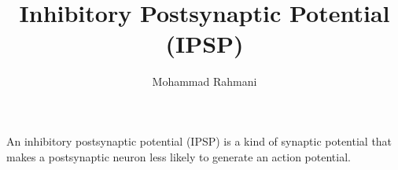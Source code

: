 \documentclass[a4paper]{article}
\title{Inhibitory Postsynaptic Potential (IPSP)}
\date{}
\author{Mohammad Rahmani}
\begin{document}
\maketitle
    An inhibitory postsynaptic potential (IPSP) is a kind of synaptic potential that makes a postsynaptic neuron less likely to generate an action potential.
    
    
\end{document}
